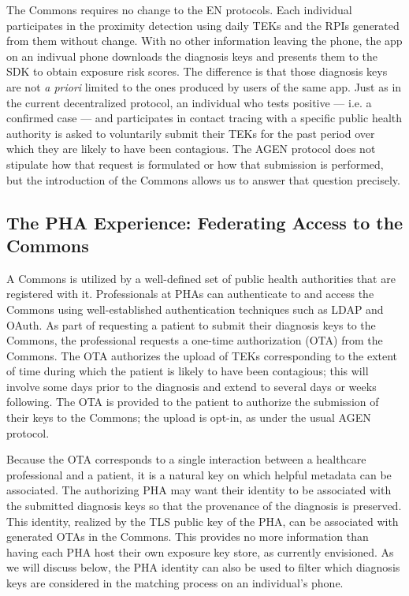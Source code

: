 The Commons requires no change to the EN protocols.
Each individual participates in the proximity detection using daily TEKs and the RPIs generated from them without change.
With no other information leaving the phone, the app on an indivual phone downloads the diagnosis keys and presents them to the SDK to obtain exposure risk scores.
The difference is that those diagnosis keys are not \emph{a priori} limited to the ones produced by users of the same app.
Just as in the current decentralized protocol, an individual who tests positive --- i.e. a confirmed case --- and participates in contact tracing with a specific public health authority is asked to voluntarily submit their TEKs for the past period over which they are likely to have been contagious.
The AGEN protocol does not stipulate how that request is formulated or how that submission is performed, but the introduction of the Commons allows us to answer that question precisely.

\subsection{The PHA Experience: Federating Access to the Commons}

A Commons is utilized by a well-defined set of public health authorities that are registered with it.
Professionals at PHAs can authenticate to and access the Commons using well-established authentication techniques such as LDAP and OAuth.
As part of requesting a patient to submit their diagnosis keys to the Commons, the professional requests a one-time authorization (OTA) from the Commons.
The OTA authorizes the upload of TEKs corresponding to the extent of time during which the patient is likely to have been contagious; this will involve some days prior to the diagnosis and extend to several days or weeks following.
The OTA is provided to the patient to authorize the submission of their keys to the Commons; the upload is opt-in, as under the usual AGEN protocol.

Because the OTA corresponds to a single interaction between a healthcare professional and a patient, it is a natural key on which helpful metadata can be associated.
The authorizing PHA may want their identity to be associated with the submitted diagnosis keys so that the provenance of the diagnosis is preserved.
This identity, realized by the TLS public key of the PHA, can be associated with generated OTAs in the Commons.
This provides no more information than having each PHA host their own exposure key store, as currently envisioned.
As we will discuss below, the PHA identity can also be used to filter which diagnosis keys are considered in the matching process on an individual's phone.

